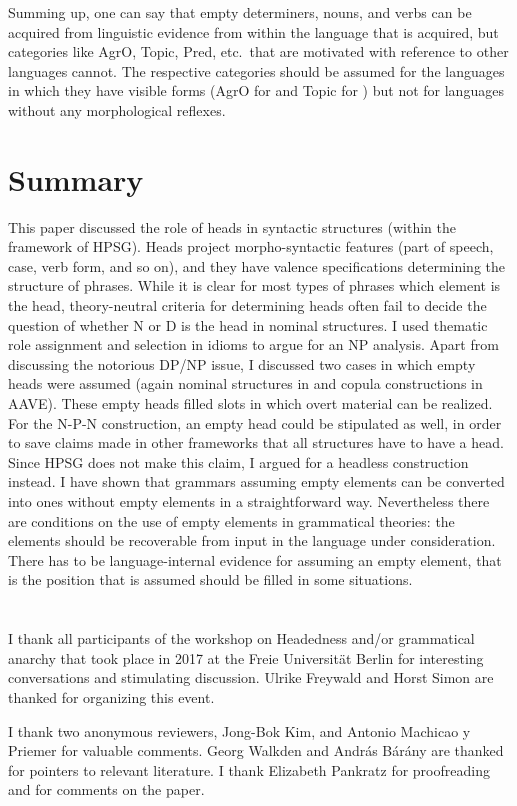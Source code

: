 \documentclass[output=paper
  ,nobabel
  ,draftmode
  ,uniformtopskip %
  ,colorlinks, citecolor=brown
]{langscibook}
\begin{document}
Summing up, one can say that empty determiners, nouns, and verbs can be acquired from linguistic
evidence from within the language that is acquired, but categories like
AgrO, Topic, Pred, etc.\ that are motivated with reference to other languages cannot. The respective
categories should be assumed for the languages in which they have visible forms (\eg AgrO for 
and Topic for ) but not for languages without any morphological reflexes.

\section{Summary}
\label{sec-summary}


This paper discussed the role of heads in syntactic structures (within the framework of HPSG). Heads
project morpho-syntactic features (part of speech, case, verb form, and so on), and they have valence
specifications determining the structure of phrases. While it is clear for most types of phrases
which element is the head, theory-neutral criteria for determining heads often fail to decide the
question of whether N or D is the head in  nominal structures. I used thematic role assignment
and selection in idioms to argue for an NP analysis. Apart from discussing the notorious DP/NP
issue, I discussed two cases in which empty heads were assumed (again nominal structures in  and copula
constructions in AAVE). These empty heads filled slots in which overt material can be realized. For
the N-P-N construction, an empty head could be stipulated as well, in order to save claims made in
other frameworks that all structures have to have a head. Since HPSG does not make this claim, I
argued for a headless construction instead. I have shown that grammars assuming empty elements can
be converted into ones without empty elements in a straightforward way. Nevertheless there are
conditions on the use of empty elements in grammatical theories: the elements should be recoverable
from input in the language under consideration. There has to be language-internal 
evidence for assuming an empty element, that is the position that is assumed should be filled in some
situations.


\section*{\acknowledgmentsUS}

I thank all participants of the workshop on Headedness and/or grammatical anarchy that took place in
2017 at the Freie Universität Berlin for interesting conversations and stimulating
discussion. Ulrike Freywald and Horst Simon are thanked for organizing this event.

I thank two anonymous reviewers, Jong-Bok Kim, and Antonio Machicao y Priemer for valuable comments.
Georg Walkden and András Bárány are thanked for pointers to relevant literature.
I thank Elizabeth Pankratz for proofreading and for comments on the paper.

{\sloppy
\printbibliography[heading=subbibliography,notkeyword=this]
}
\end{document}
